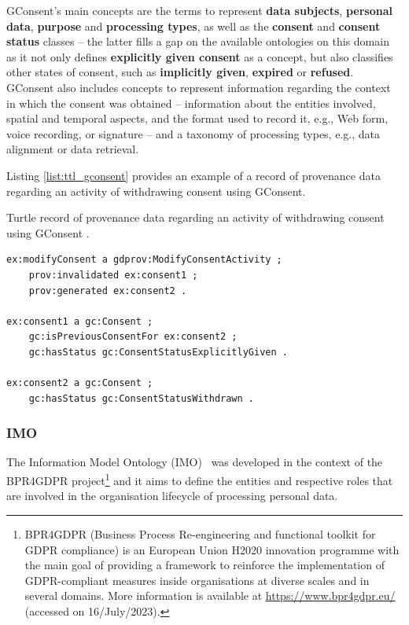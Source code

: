 GConsent's main concepts are the terms to represent \textbf{data subjects}, \textbf{personal data}, \textbf{purpose} and \textbf{processing types}, as well as the \textbf{consent} and \textbf{consent status} classes -- the latter fills a gap on the available ontologies on this domain as it not only defines \textbf{explicitly given consent} as a concept, but also classifies other states of consent, such as \textbf{implicitly given}, \textbf{expired} or \textbf{refused}.
GConsent also includes concepts to represent information regarding the context in which the consent was obtained -- information about the entities involved, spatial and temporal aspects, and the format used to record it, e.g., Web form, voice recording, or signature -- and a taxonomy of processing types, e.g., data alignment or data retrieval.

Listing \ref{list:ttl_gconsent} provides an example of a record of provenance data regarding an activity of withdrawing consent using GConsent.

\begin{listing}[ht]
\caption{Turtle record of provenance data regarding an activity of withdrawing consent using GConsent \citep{hitzler_gconsent_2019}.}
\label{list:ttl_gconsent}
\begin{verbatim}
ex:modifyConsent a gdprov:ModifyConsentActivity ;
    prov:invalidated ex:consent1 ;
    prov:generated ex:consent2 .

ex:consent1 a gc:Consent ;
    gc:isPreviousConsentFor ex:consent2 ;
    gc:hasStatus gc:ConsentStatusExplicitlyGiven .

ex:consent2 a gc:Consent ;
    gc:hasStatus gc:ConsentStatusWithdrawn .
\end{verbatim}
\end{listing}

\subsubsection{IMO}
\label{sec:imo}

The Information Model Ontology (IMO)~\citep{papagiannakopoulou_leveraging_2014,lioudakis_compliance_2019} was developed in the context of the BPR4GDPR project\footnote{BPR4GDPR (Business Process Re-engineering and functional toolkit for GDPR compliance) is an European Union H2020 innovation programme with the main goal of providing a framework to reinforce the implementation of GDPR-compliant measures inside organisations at diverse scales and in several domains. More information is available at \url{https://www.bpr4gdpr.eu/} (accessed on 16/July/2023).} and it aims to define the entities and respective roles that are involved in the organisation lifecycle of processing personal data.

